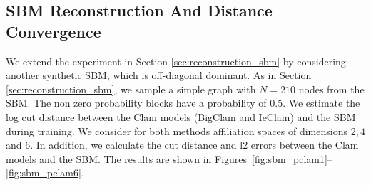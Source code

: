 \documentclass{article}
\theoremstyle{plain}
\theoremstyle{definition}
\theoremstyle{remark}
\begin{document}
\subsection{SBM Reconstruction And Distance Convergence}
We extend the experiment in Section \ref{sec:reconstruction_sbm} by considering another  synthetic SBM, which is off-diagonal dominant. As in Section \ref{sec:reconstruction_sbm}, we sample a simple graph with $N=210$ nodes from the SBM. The non zero probability blocks have a probability of $0.5$. We estimate the log cut distance between the Clam models (BigClam and IeClam) and the SBM during training. We consider for both methods affiliation spaces of dimensions $2,4$ and $6$. In addition, we calculate the cut distance and l2 errors between the Clam models and the SBM. The results are shown in Figures~\ref{fig:sbm_pclam1}--\ref{fig:sbm_pclam6}.
\end{document}

